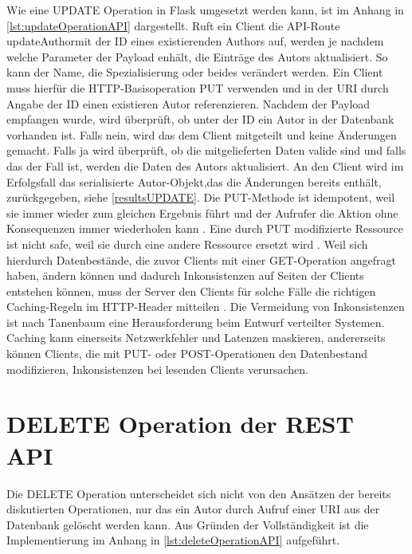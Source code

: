 \documentclass[a4paper,titlepage,halfparskip,12pt,listof=numbered]{scrreprt}
\begin{document}
\begin{onehalfspacing}
Wie eine UPDATE Operation in Flask umgesetzt werden kann, ist im Anhang in \autoref{lst:updateOperationAPI} dargestellt. Ruft ein Client die \ac{API}-Route \glqq updateAuthor\grqq mit der ID eines existierenden Authors auf, werden je nachdem welche Parameter der Payload enhält, die Einträge des Autors aktualisiert. So kann der Name, die Spezialisierung oder beides verändert werden. Ein Client muss hierfür die \ac{HTTP}-Basisoperation PUT verwenden und in der \acs{URI} durch Angabe der ID einen existieren Autor referenzieren. Nachdem der Payload empfangen wurde, wird überprüft, ob unter der ID ein Autor in der Datenbank vorhanden ist. Falls nein, wird das dem Client mitgeteilt und keine Änderungen gemacht. Falls ja wird überprüft, ob die mitgelieferten Daten valide sind und falls das der Fall ist, werden die Daten des Autors aktualisiert. An den Client wird im Erfolgsfall das serialisierte Autor-Objekt,das die Änderungen bereits enthält, zurückgegeben, siehe \autoref{resultsUPDATE}. Die PUT-Methode ist idempotent, weil sie immer wieder zum gleichen Ergebnis führt und der Aufrufer die Aktion ohne Konsequenzen immer wiederholen kann \cite{rahnRESTAPI}. Eine durch PUT modifizierte Ressource ist nicht safe, weil sie durch eine andere Ressource ersetzt wird \cite{rahnRESTAPI}. Weil sich hierdurch Datenbestände, die zuvor Clients mit einer GET-Operation angefragt haben, ändern können und dadurch Inkonsistenzen auf Seiten der Clients entstehen können, muss der Server den Clients für solche Fälle die richtigen Caching-Regeln im \ac{HTTP}-Header mitteilen \cite{cachingRESTAPI}. Die Vermeidung von Inkonsistenzen ist nach Tanenbaum \cite[S.32]{andrew2008verteilte} eine Herausforderung beim Entwurf verteilter Systemen. Caching kann einerseits Netzwerkfehler und Latenzen maskieren, andererseits können Clients, die mit PUT- oder POST-Operationen den Datenbestand modifizieren, Inkonsistenzen bei lesenden Clients verursachen.

\section{DELETE Operation der \ac{REST} \ac{API}}
\label{sec:deleteAPI}

Die DELETE Operation unterscheidet sich nicht von den Ansätzen der bereits diskutierten Operationen, nur das ein Autor durch Aufruf einer \acs{URI} aus der Datenbank gelöscht werden kann. Aus Gründen der Vollständigkeit ist die Implementierung im Anhang in \autoref{lst:deleteOperationAPI} aufgeführt.


\end{onehalfspacing}
\end{document}
